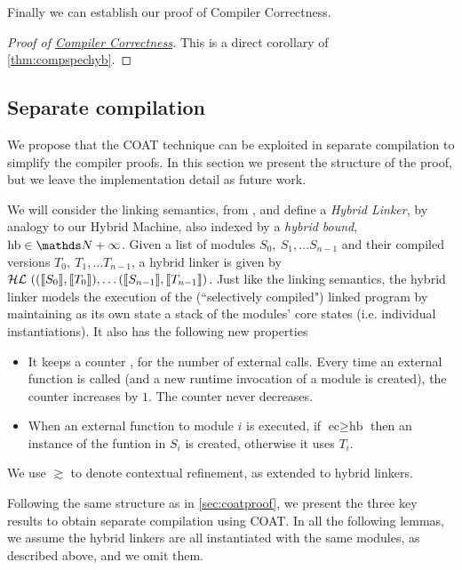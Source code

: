 Finally we can establish our proof of Compiler Correctness.

\begin{proof}[Proof of {\hyperref[thm:compspec]{Compiler Correctness}}] This is a direct corollary of \cref{thm:compspechyb}.
\end{proof}

\subsection{Separate compilation}\label{sec:sepcomp}

We propose that the COAT technique can be exploited in separate compilation to simplify the compiler proofs. In this section we present the structure of the proof, but we leave the implementation detail as future work.

We will consider the linking semantics, from \cite{compcomp}, and define a \emph{Hybrid Linker}, by analogy to our Hybrid Machine, also indexed by a \emph{hybrid bound}, $\text{hb} \in \nat + \infty$.  
Given a list of modules $S_0,\ S_1, \dots S_{n-1}$ and their compiled versions $T_0,\ T_1, \dots T_{n-1}$, a hybrid linker is given by 
$\HL \ ((\llbracket S_0 \rrbracket, \llbracket T_0 \rrbracket), %
\dots (\llbracket S_{n-1} \rrbracket, \llbracket T_{n-1} \rrbracket)$. Just like the linking semantics, the hybrid linker models the execution of the (``selectively compiled") linked program by maintaining as its
own state a stack of the modules' core states (i.e. individual instantiations). It also has the following new properties
\begin{itemize}
\item It keeps a counter , for the number of external calls. Every time an external function is called (and a new runtime invocation of a module is created), the counter increases by $1$. The counter never decreases.
\item When an external function to module $i$ is executed, if $\text{ec} \geq \text{hb}$ then an instance of the funtion in $S_i$ is created, otherwise it uses $T_i$.
\end{itemize}

We use $\gtrsim$ to denote contextual refinement, as extended to hybrid linkers.

Following the same structure as in \cref{sec:coatproof}, we present the three key results to obtain separate compilation using COAT. In all the following lemmas, we assume the hybrid linkers are all instantiated with the same modules, as described above, and we omit them.


